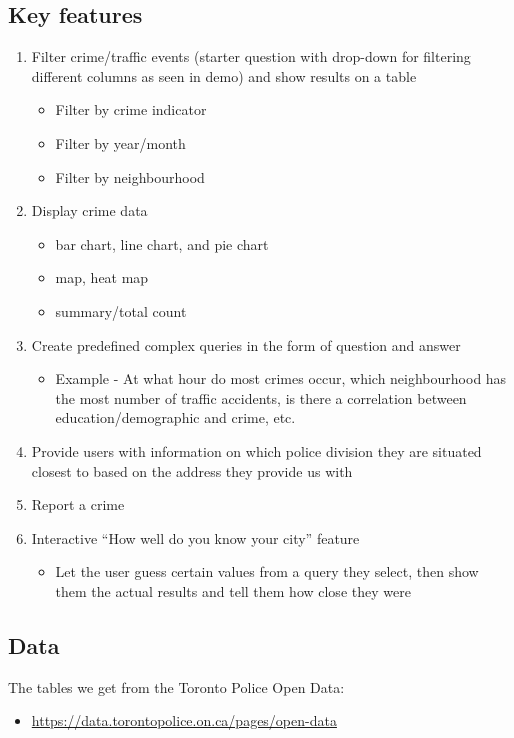 \documentclass[12pt, a4paper]{article}
\begin{document}
\subsection*{Key features}
\begin{enumerate}
\item Filter crime/traffic events (starter question with drop-down for filtering different columns as seen in demo) and show results on a table
\begin{itemize}
    
    \item Filter by crime indicator
    \item Filter by year/month
    \item Filter by neighbourhood
\end{itemize}
\item Display crime data
\begin{itemize}
\item bar chart, line chart, and pie chart
\item map, heat map

\item summary/total count
\end{itemize}
\item Create predefined complex queries in the form of question and answer
\begin{itemize}
    \item Example - At what hour do most crimes occur, which neighbourhood has the most number of traffic accidents, is there a correlation between education/demographic and crime, etc.
\end{itemize}
\item Provide users with information on which police division they are situated closest to based on the address they provide us with
\item Report a crime
\item Interactive “How well do you know your city” feature
\begin{itemize}
    \item Let the user guess certain values from a query they select, then show them the actual results and tell them how close they were
\end{itemize}
\end{enumerate}
\subsection*{Data}
The tables we get from the Toronto Police Open Data:
\begin{itemize}
    \item \url{https://data.torontopolice.on.ca/pages/open-data}
\end{itemize}
\end{document}

